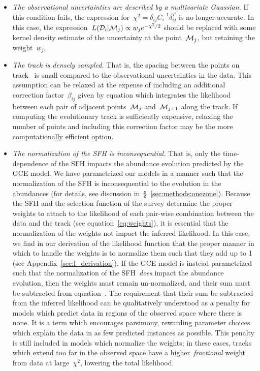 \documentclass[ms.tex]{subfiles}
\begin{document}
\begin{itemize}
\begin{itemize}
		\item \textit{The observational uncertainties are described by a
		multivariate Gaussian.}
		If this condition fails, the expression for~$\chi^2 =
		\delta_{ij}C_i^{-1}\delta_{ij}^T$ is no longer accurate.
		In this case, the expression~$L(\mathcal{D}_i | \mathcal{M}_j) \propto
		w_j e^{-\chi^2/2}$ should be replaced with some kernel density
		estimate of the uncertainty at the point~$\mathcal{M}_j$, but retaining
		the weight~$w_j$.

		\item \textit{The track is densely sampled.}
		That is, the spacing between the points on track~ is small
		compared to the observational uncertainties in the data.
		This assumption can be relaxed at the expense of including an
		additional correction factor~$\beta_{ij}$ given by equation
		 which integrates the likelihood between each
		pair of adjacent points~$\mathcal{M}_j$ and~$\mathcal{M}_{j + 1}$ along
		the track.
		If computing the evolutionary track is sufficiently expensive,
		relaxing the number of points and including this correction factor may
		be the more computationally efficient option.

		\item \textit{The normalization of the SFH is inconsequential.}
		That is, only the time-dependence of the SFH impacts the abundance
		evolution predicted by the GCE model.
		We have parametrized our models in a manner such that the normalization
		of the SFH is inconsequential to the evolution in the abundances (for
		details, see discussion in~\S~\ref{sec:methods:onezone}).
		Because the SFH and the selection function of the survey determine the
		proper weights to attach to the likelihood of each pair-wise
		combination between the data and the track (see
		equation~\ref{eq:weights}), it is essential that the normalization of
		the weights not impact the inferred likelihood.
		In this case, we find in our derivation of the likelihood function that
		the proper manner in which to handle the weights is to normalize them
		such that they add up to 1 (see Appendix~\ref{sec:l_derivation}).
		If the GCE model is instead parametrized such that the normalization of
		the SFH~\textit{does} impact the abundance evolution, then the weights
		must remain un-normalized, and their sum must be subtracted from
		equation~.
		The requirement that their sum be subtracted from the inferred
		likelihood can be qualitatively understood as a penalty for models
		which predict data in regions of the observed space where there is
		none.
		It is a term which encourages parsimony, rewarding parameter choices
		which explain the data in as few predicted instances as possible.
		This penalty is still included in models which normalize the weights;
		in these cases, tracks which extend too far in the observed space
		have a higher~\textit{fractional} weight from data at large~$\chi^2$,
		lowering the total likelihood.
	\end{itemize}


\end{itemize}
\end{document}
